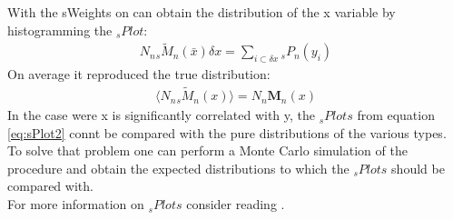 \documentclass[english]{uzhpub}
\begin{document}
 With the sWeights on can obtain the distribution of the x variable by histogramming the $_s Plot$:
 \begin{align}
  N_n { }_{s} \tilde{M}_n (\bar{x}) \delta x = \sum_{i \subset \delta x} { }_{s} P_n (y_i) \label{eq:sPlot2}
 \end{align}
 On average it reproduced the true distribution:
 \begin{align}
  \langle N_n { }_s \tilde{M}_n (x) \rangle = N_n \textbf{M}_n (x)
 \end{align}
 In the case were x is significantly correlated with y, the $_s Plots$ from equation \ref{eq:sPlot2} connt be compared with the pure distributions of the various types. To solve that problem one can perform a Monte Carlo simulation of the procedure and obtain the expected distributions to which the $_s Plots$ should be compared with. \\
 For more information on $_s Plots$ consider reading \cite{bib:sPlot}.
\end{document}

